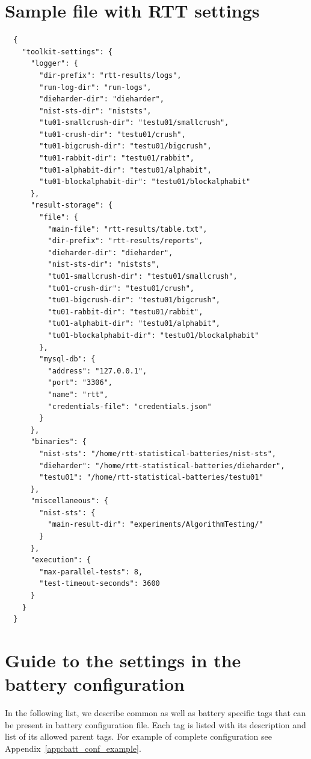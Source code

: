 \documentclass[
	digital,    %
	oneside,    %
	color,
	11pt,
	nocover,
	notable,
	nolof,
	nolot,
]{fithesis3}
\theoremstyle{definition}
\theoremstyle{remark}
\begin{document}
\chapter{Sample file with RTT settings}
\label{app:rtt_sett_json}
\begin{verbatim}
  {
    "toolkit-settings": {
      "logger": {
        "dir-prefix": "rtt-results/logs",
        "run-log-dir": "run-logs",
        "dieharder-dir": "dieharder",
        "nist-sts-dir": "niststs",
        "tu01-smallcrush-dir": "testu01/smallcrush",
        "tu01-crush-dir": "testu01/crush",
        "tu01-bigcrush-dir": "testu01/bigcrush",
        "tu01-rabbit-dir": "testu01/rabbit",
        "tu01-alphabit-dir": "testu01/alphabit",
        "tu01-blockalphabit-dir": "testu01/blockalphabit"
      },
      "result-storage": {
        "file": {
          "main-file": "rtt-results/table.txt",
          "dir-prefix": "rtt-results/reports",
          "dieharder-dir": "dieharder",
          "nist-sts-dir": "niststs",
          "tu01-smallcrush-dir": "testu01/smallcrush",
          "tu01-crush-dir": "testu01/crush",
          "tu01-bigcrush-dir": "testu01/bigcrush",
          "tu01-rabbit-dir": "testu01/rabbit",
          "tu01-alphabit-dir": "testu01/alphabit",
          "tu01-blockalphabit-dir": "testu01/blockalphabit"
        },
        "mysql-db": {
          "address": "127.0.0.1",
          "port": "3306",
          "name": "rtt",
          "credentials-file": "credentials.json"
        }
      },
      "binaries": {
        "nist-sts": "/home/rtt-statistical-batteries/nist-sts",
        "dieharder": "/home/rtt-statistical-batteries/dieharder",
        "testu01": "/home/rtt-statistical-batteries/testu01"
      },
      "miscellaneous": {
        "nist-sts": {
          "main-result-dir": "experiments/AlgorithmTesting/"
        }
      },
      "execution": {
        "max-parallel-tests": 8,
        "test-timeout-seconds": 3600
      }
    }
  }
\end{verbatim}

\chapter{Guide to the settings in the battery configuration}
\label{app:batt_conf_guide}
In the following list, we describe common as well as battery specific tags that can be present in battery configuration file. Each tag is listed with its description and list of its allowed parent tags. For example of complete configuration see Appendix~\ref{app:batt_conf_example}.
\end{document}

